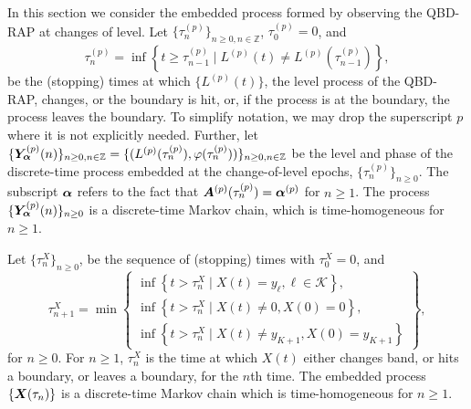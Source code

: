 In this section we consider the embedded process formed by observing the QBD-RAP at changes of level. Let \(\{\tau_n^{(p)}\}_{n\geq 0, n \in \mathbb Z}\), \(\tau_0^{(p)}=0\), and
\[\tau_{n}^{(p)} = \inf\left\{t\geq \tau_{n-1}^{(p)} \mid L^{(p)}(t)\neq L^{(p)}(\tau_{n-1}^{(p)})\right\},\]
be the (stopping) times at which \(\{L^{(p)}(t)\}\), the level process of the QBD-RAP, changes, or the boundary is hit, or, if the process is at the boundary, the process leaves the boundary. To simplify notation, we may drop the superscript \(p\) where it is not explicitly needed. Further, let \(\{\bm{Y}_{\bm{\alpha}}^{(p)}(n)\}_{n\geq 0, n \in \mathbb Z} = \{(L^{(p)}(\tau_n^{(p)}),\varphi(\tau_n^{(p)}))\}_{n\geq 0, n \in \mathbb Z}\) be the level and phase of the discrete-time process embedded at the change-of-level epochs, \(\{\tau_n^{(p)}\}_{n\geq 0}\). The subscript \(\boldsymbol \alpha \) refers to the fact that \(\boldsymbol A^{(p)}(\tau_n^{(p)})=\boldsymbol \alpha^{(p)}\) for \(n\geq 1\). The process \(\{\bm{Y}_{\bm{\alpha}}^{(p)}(n)\}_{n\geq 0}\) is a discrete-time Markov chain, which is time-homogeneous for \(n\geq 1\). 

Let \(\{\tau_n^X\}_{n\geq 0}\), be the sequence of (stopping) times with \(\tau_0^X=0\), and 
\[\tau_{n+1}^X = \min\left\{\begin{array}{c}\inf\left\{t>\tau_n^X\mid X(t)=y_{\ell}, \ell\in\mathcal K\right\}, \\ \inf\left\{t>\tau_n^X \mid X(t) \neq 0, X(0)=0\right\}, \\ \inf\left\{t>\tau_n^X \mid X(t) \neq y_{K+1}, X(0)=y_{K+1}\right\} \end{array} \right\},\]
for \(n\geq 0\). For \(n\geq 1\), \(\tau_n^X\) is the time at which \(X(t)\) either changes band, or hits a boundary, or leaves a boundary, for the \(n\)th time. The embedded process \(\{\boldsymbol X(\tau_n)\}\) is a discrete-time Markov chain which is time-homogeneous for \(n\geq 1\). 

